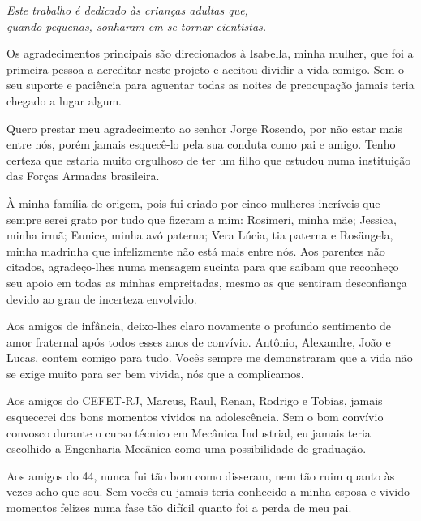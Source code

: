 \begin{dedicatoria}
   \vspace*{\fill}
   \centering
   \noindent
   \textit{Este trabalho é dedicado às crianças adultas que,\\
   quando pequenas, sonharam em se tornar cientistas.} \vspace*{\fill}
\end{dedicatoria}

\begin{agradecimentos}
Os agradecimentos principais são direcionados à Isabella, minha mulher, que foi a primeira pessoa a acreditar neste projeto e aceitou dividir a vida comigo. Sem o seu suporte e paciência para aguentar todas as noites de preocupação jamais teria chegado a lugar algum.

Quero prestar meu agradecimento ao senhor Jorge Rosendo, por não estar mais entre nós, porém jamais esquecê-lo pela sua conduta como pai e amigo. Tenho certeza que estaria muito orgulhoso de ter um filho que estudou numa instituição das Forças Armadas brasileira.

À minha família de origem, pois fui criado por cinco mulheres incríveis que sempre serei grato por tudo que fizeram a mim: Rosimeri, minha mãe; Jessica, minha irmã; Eunice, minha avó paterna; Vera Lúcia, tia paterna e Rosängela, minha madrinha que infelizmente não está mais entre nós. Aos parentes não citados, agradeço-lhes numa mensagem sucinta para que saibam que reconheço seu apoio em todas as minhas empreitadas, mesmo as que sentiram desconfiança devido ao grau de incerteza envolvido.

Aos amigos de infância, deixo-lhes claro novamente o profundo sentimento de amor fraternal após todos esses anos de convívio. Antônio, Alexandre, João e Lucas, contem comigo para tudo. Vocês sempre me demonstraram que a vida não se exige muito para ser bem vivida, nós que a complicamos.

Aos amigos do CEFET-RJ, Marcus, Raul, Renan, Rodrigo e Tobias, jamais esquecerei dos bons momentos vividos na adolescência. Sem o bom convívio convosco durante o curso técnico em Mecânica Industrial, eu jamais teria escolhido a Engenharia Mecânica como uma possibilidade de graduação.

Aos amigos do 44, nunca fui tão bom como disseram, nem tão ruim quanto às vezes acho que sou. Sem vocês eu jamais teria conhecido a minha esposa e vivido momentos felizes numa fase tão difícil quanto foi a perda de meu pai.


\end{agradecimentos}
